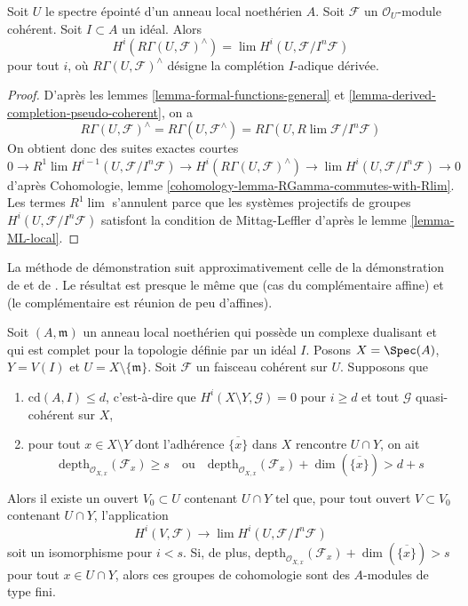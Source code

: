 \begin{lemma}
\label{lemma-compare-with-derived-completion}
Soit $U$ le spectre épointé d'un anneau local noethérien $A$.
Soit $\mathcal{F}$ un $\mathcal{O}_U$-module cohérent.
Soit $I \subset A$ un idéal. Alors
$$
H^i(R\Gamma(U, \mathcal{F})^\wedge) =
\lim H^i(U, \mathcal{F}/I^n\mathcal{F})
$$
pour tout $i$, où $R\Gamma(U, \mathcal{F})^\wedge$ désigne
la complétion $I$-adique dérivée.
\end{lemma}

\begin{proof}
D'après les lemmes \ref{lemma-formal-functions-general} et
\ref{lemma-derived-completion-pseudo-coherent}, on a
$$
R\Gamma(U, \mathcal{F})^\wedge =
R\Gamma(U, \mathcal{F}^\wedge) =
R\Gamma(U, R\lim \mathcal{F}/I^n\mathcal{F})
$$
On obtient donc des suites exactes courtes
$$
0 \to R^1\lim H^{i - 1}(U, \mathcal{F}/I^n\mathcal{F}) \to
H^i(R\Gamma(U, \mathcal{F})^\wedge) \to
\lim H^i(U, \mathcal{F}/I^n\mathcal{F}) \to 0
$$
d'après Cohomologie, lemme \ref{cohomology-lemma-RGamma-commutes-with-Rlim}.
Les termes $R^1\lim$ s'annulent parce que les systèmes projectifs de groupes
$H^i(U, \mathcal{F}/I^n\mathcal{F})$ satisfont la condition de Mittag-Leffler
d'après le lemme \ref{lemma-ML-local}.
\end{proof}

\begin{theorem}
\label{theorem-algebraization-formal-sections}
\begin{reference}
La méthode de démonstration suit approximativement celle de la
démonstration de \cite[Theorem 1]{Faltings-algebraisation}
et de \cite[Satz 2]{Faltings-uber}.
Le résultat est presque le même que
\cite[Theorem 1.1]{MRaynaud-paper} (cas du complémentaire affine) et
\cite[Theorem 3.9]{MRaynaud-book} (le complémentaire est réunion de peu d'affines).
\end{reference}
Soit $(A, \mathfrak m)$ un anneau local noethérien qui possède un
complexe dualisant et qui est complet pour la topologie définie par un idéal $I$.
Posons $X = \Spec(A)$, $Y = V(I)$ et $U = X \setminus \{\mathfrak m\}$.
Soit $\mathcal{F}$ un faisceau cohérent sur $U$.
Supposons que
\begin{enumerate}
\item $\text{cd}(A, I) \leq d$, c'est-à-dire que
$H^i(X \setminus Y, \mathcal{G}) = 0$ pour $i \geq d$ et tout
$\mathcal{G}$ quasi-cohérent sur $X$,
\item pour tout $x \in X \setminus Y$ dont l'adhérence $\overline{\{x\}}$
dans $X$ rencontre $U \cap Y$, on ait
$$
\text{depth}_{\mathcal{O}_{X, x}}(\mathcal{F}_x) \geq s
\quad\text{ou}\quad
\text{depth}_{\mathcal{O}_{X, x}}(\mathcal{F}_x)
+ \dim(\overline{\{x\}}) > d + s
$$
\end{enumerate}
Alors il existe un ouvert $V_0 \subset U$ contenant $U \cap Y$
tel que, pour tout ouvert $V \subset V_0$ contenant $U \cap Y$,
l'application
$$
H^i(V, \mathcal{F}) \to \lim H^i(U, \mathcal{F}/I^n\mathcal{F})
$$
soit un isomorphisme pour $i < s$. Si, de plus,
$
\text{depth}_{\mathcal{O}_{X, x}}(\mathcal{F}_x) +
\dim(\overline{\{x\}}) > s
$
pour tout $x \in U \cap Y$, alors ces groupes de cohomologie sont des $A$-modules de type fini.
\end{theorem}

